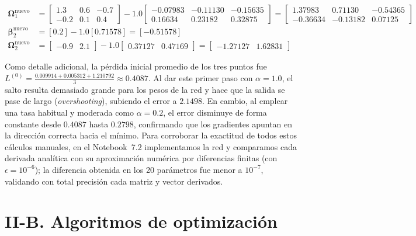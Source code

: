 \documentclass[10pt,a4paper]{article}
\begin{document}
{\begin{align*}
\boldsymbol{\Omega}_1^{\text{nuevo}} &= \begin{bmatrix} 1.3 & 0.6 & -0.7 \\ -0.2 & 0.1 & 0.4 \end{bmatrix} - 1.0 \begin{bmatrix} -0.07983 & -0.11130 & -0.15635 \\ 0.16634 & 0.23182 & 0.32875 \end{bmatrix} = \mathbf{\begin{bmatrix} 1.37983 & 0.71130 & -0.54365 \\ -0.36634 & -0.13182 & 0.07125 \end{bmatrix}} \\[0.03cm]
\boldsymbol{\beta}_2^{\text{nuevo}} &= [0.2] - 1.0 [0.71578] = \mathbf{[-0.51578]} \\[0.03cm]
\boldsymbol{\Omega}_2^{\text{nuevo}} &= \begin{bmatrix} -0.9 & 2.1 \end{bmatrix} - 1.0 \begin{bmatrix} 0.37127 & 0.47169 \end{bmatrix} = \mathbf{\begin{bmatrix} -1.27127 & 1.62831 \end{bmatrix}}
\end{align*}
}

Como detalle adicional, la pérdida inicial promedio de los tres puntos fue $L^{(0)} = \frac{0.009914 + 0.005312 + 1.210792}{3} \approx 0.4087$. Al dar este primer paso con $\alpha = 1.0$, el salto resulta demasiado grande para los pesos de la red y hace que la salida se pase de largo (\textit{overshooting}), subiendo el error a $2.1498$. En cambio, al emplear una tasa habitual y moderada como $\alpha = 0.2$, el error disminuye de forma constante desde $0.4087$ hasta $0.2798$, confirmando que los gradientes apuntan en la dirección correcta hacia el mínimo. Para corroborar la exactitud de todos estos cálculos manuales, en el Notebook~7.2 implementamos la red y comparamos cada derivada analítica con su aproximación numérica por diferencias finitas (con $\epsilon = 10^{-6}$); la diferencia obtenida en los 20 parámetros fue menor a $10^{-7}$, validando con total precisión cada matriz y vector derivados.

\section*{II-B. Algoritmos de optimización}
\end{document}
